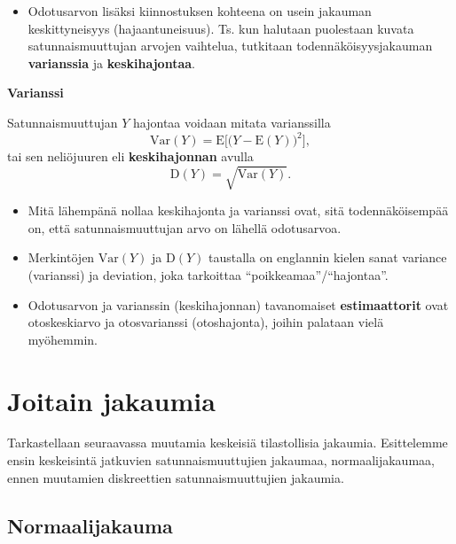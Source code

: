 \documentclass[
]{book}
\providecommand{\tightlist}{%
  \setlength{\itemsep}{0pt}\setlength{\parskip}{0pt}}
\begin{document}
\hfill\break

\begin{itemize}
\tightlist
\item
  Odotusarvon lisäksi kiinnostuksen kohteena on usein jakauman keskittyneisyys (hajaantuneisuus). Ts. kun halutaan puolestaan kuvata satunnaismuuttujan arvojen vaihtelua, tutkitaan todennäköisyysjakauman \textbf{varianssia} ja \textbf{keskihajontaa}.
\end{itemize}

\begin{defblock}{}

\textbf{Varianssi}

Satunnaismuuttujan \(Y\) hajontaa voidaan mitata varianssilla
\[
\mathrm{Var}(Y) = \text{E}\Big[\Big(Y-\text{E}(Y)\Big)^2\Big],
\]
tai sen neliöjuuren eli \textbf{keskihajonnan} avulla
\[
\text{D}(Y) = \sqrt{\mathrm{Var}(Y)}.
\]

\begin{itemize}
\tightlist
\item
  Mitä lähempänä nollaa keskihajonta ja varianssi ovat, sitä todennäköisempää on, että satunnaismuuttujan arvo on lähellä odotusarvoa.
\item
  Merkintöjen \(\mathrm{Var}(Y)\) ja \(\text{D}(Y)\) taustalla on englannin kielen sanat variance (varianssi) ja deviation, joka tarkoittaa ``poikkeamaa''/``hajontaa''.
\end{itemize}

\end{defblock}

\begin{itemize}
\tightlist
\item
  Odotusarvon ja varianssin (keskihajonnan) tavanomaiset \textbf{estimaattorit} ovat otoskeskiarvo ja otosvarianssi (otoshajonta), joihin palataan vielä myöhemmin.
\end{itemize}

\hypertarget{alaluku45}{%
\section{Joitain jakaumia}\label{alaluku45}}

Tarkastellaan seuraavassa muutamia keskeisiä tilastollisia jakaumia. Esittelemme ensin keskeisintä jatkuvien satunnaismuuttujien jakaumaa, normaalijakaumaa, ennen muutamien diskreettien satunnaismuuttujien jakaumia.

\hypertarget{normaalijakauma}{%
\subsection{Normaalijakauma}\label{normaalijakauma}}
\end{document}
